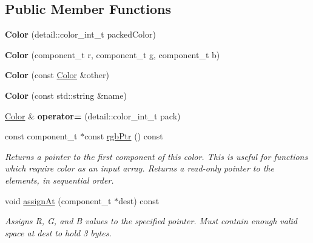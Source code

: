\subsection*{Public Member Functions}
\begin{DoxyCompactItemize}
\item 
\mbox{\label{classcturtle_1_1Color_a38fcd21477603112e90092cbaf358f3a}} 
{\bfseries Color} (detail\+::color\+\_\+int\+\_\+t packed\+Color)
\item 
\mbox{\label{classcturtle_1_1Color_a759c7ab4973583164f86c9371d637fe6}} 
{\bfseries Color} (component\+\_\+t r, component\+\_\+t g, component\+\_\+t b)
\item 
\mbox{\label{classcturtle_1_1Color_afcd035af137a24bef76c3699f1470b6f}} 
{\bfseries Color} (const \hyperlink{classcturtle_1_1Color}{Color} \&other)
\item 
\mbox{\label{classcturtle_1_1Color_a3a3acf7d28bd8259ce7c43666f403447}} 
{\bfseries Color} (const std\+::string \&name)
\item 
\mbox{\label{classcturtle_1_1Color_a49a7db8dff7e1699ac61276cb27d6166}} 
\hyperlink{classcturtle_1_1Color}{Color} \& {\bfseries operator=} (detail\+::color\+\_\+int\+\_\+t pack)
\item 
\mbox{\label{classcturtle_1_1Color_adecef34180b8bebd7d5f0e9d4327a586}} 
const component\+\_\+t $\ast$const \hyperlink{classcturtle_1_1Color_adecef34180b8bebd7d5f0e9d4327a586}{rgb\+Ptr} () const
\begin{DoxyCompactList}\small\item\em Returns a pointer to the first component of this color. This is useful for functions which require color as an input array. Returns a read-\/only pointer to the elements, in sequential order. \end{DoxyCompactList}\item 
\mbox{\label{classcturtle_1_1Color_ae285f2470e145a4bc34e22bc2f23dc5b}} 
void \hyperlink{classcturtle_1_1Color_ae285f2470e145a4bc34e22bc2f23dc5b}{assign\+At} (component\+\_\+t $\ast$dest) const
\begin{DoxyCompactList}\small\item\em Assigns R, G, and B values to the specified pointer. Must contain enough valid space at dest to hold 3 bytes. \end{DoxyCompactList}\end{DoxyCompactItemize}
